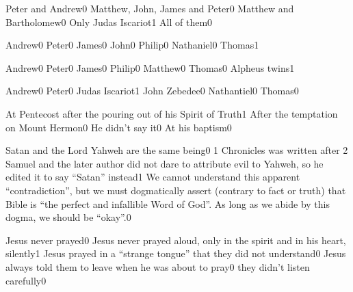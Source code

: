 {Peter and Andrew}{0}
{Matthew, John, James and Peter}{0}
{Matthew and Bartholomew}{0}
{Only Judas Iscariot}{1}
{All of them}{0}
\qstop

{Andrew}{0}
{Peter}{0}
{James}{0}
{John}{0}
{Philip}{0}
{Nathaniel}{0}
{Thomas}{1}
\qstop

{Andrew}{0}
{Peter}{0}
{James}{0}
{Philip}{0}
{Matthew}{0}
{Thomas}{0}
{Alpheus twins}{1}
\qstop


{Andrew}{0}
{Peter}{0}
{Judas Iscariot}{1}
{John Zebedee}{0}
{Nathantiel}{0}
{Thomas}{0}
\qstop


{At Pentecost after the pouring out of his Spirit of Truth}{1}
{After the temptation on Mount Hermon}{0}
{He didn't say it}{0}
{At his baptism}{0}
\qstop


{Satan and the Lord Yahweh are the same being}{0}
{1 Chronicles was written after 2 Samuel and the later author did not dare to attribute evil to Yahweh, so he edited it to say ``Satan'' instead}{1}
{We cannot understand this apparent ``contradiction'', but we must dogmatically assert (contrary to fact or truth) that Bible is ``the perfect and infallible Word of God''. As long as we abide by this dogma, we should be ``okay''.}{0}
\qstop



{Jesus never prayed}{0}
{Jesus never prayed aloud, only in the spirit and in his heart, silently}{1}
{Jesus prayed in a ``strange tongue'' that they did not understand}{0}
{Jesus always told them to leave when he was about to pray}{0}
{they didn't listen carefully}{0}
\qstop

